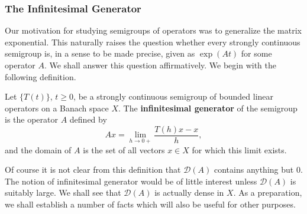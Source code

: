 \subsubsection{The Infinitesimal Generator}\label{subsec:semigroup-infinitesimal-generator}

Our motivation for studying semigroups of operators was to generalize the matrix exponential. This naturally raises the question whether every strongly continuous semigroup is, in a sense to be made precise, given as $\exp(At)$ for some operator $A$. We shall answer this question affirmatively. We begin with the following definition.

\begin{Definition}
\label{def:semigroup-infinitesimal-generator}
Let $\{T(t)\}$, $t\geq0$, be a strongly continuous semigroup of bounded linear operators on a Banach space $X$. The \textbf{infinitesimal generator} of the semigroup is the operator $A$ defined by
\begin{equation}\label{eq:semigroup-infinitesimal-generator-definition}
Ax=\lim_{h\to0+}\dfrac{T(h)x-x}{h},
\end{equation}
and the domain of $A$ is the set of all vectors $x\in X$ for which this limit exists.
\end{Definition}

Of course it is not clear from this definition that $\mathcal{D}(A)$ contains anything but 0. The notion of infinitesimal generator would be of little interest unless $\mathcal{D}(A)$ is suitably large. We shall see that $\mathcal{D}(A)$ is actually dense in $X$. As a preparation, we shall establish a number of facts which will also be useful for other purposes.

